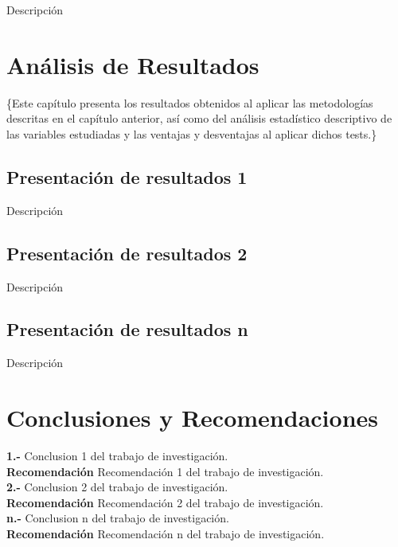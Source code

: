\documentclass[oneside,11pt]{Latex/Classes/PhDthesisPSnPDF}
\begin{document}
Descripción\\

\chapter{Análisis de Resultados}

\{\small Este capítulo presenta los resultados obtenidos al aplicar las
metodologías descritas en el capítulo anterior, así como del análisis
estadístico descriptivo de las variables estudiadas y las ventajas y
desventajas al aplicar dichos tests.\}

\section{Presentación de resultados 1}

Descripción\\

\section{Presentación de resultados 2}

Descripción\\

\section{Presentación de resultados n}

Descripción\\

\chapter{Conclusiones y Recomendaciones}

\textbf{1.-} Conclusion 1 del trabajo de investigación.\\

\textbf{Recomendación} Recomendación 1 del trabajo de investigación.\\

\textbf{2.-} Conclusion 2 del trabajo de investigación.\\

\textbf{Recomendación} Recomendación 2 del trabajo de investigación.\\

\textbf{n.-} Conclusion n del trabajo de investigación.\\

\textbf{Recomendación} Recomendación n del trabajo de investigación.\\
\end{document}
